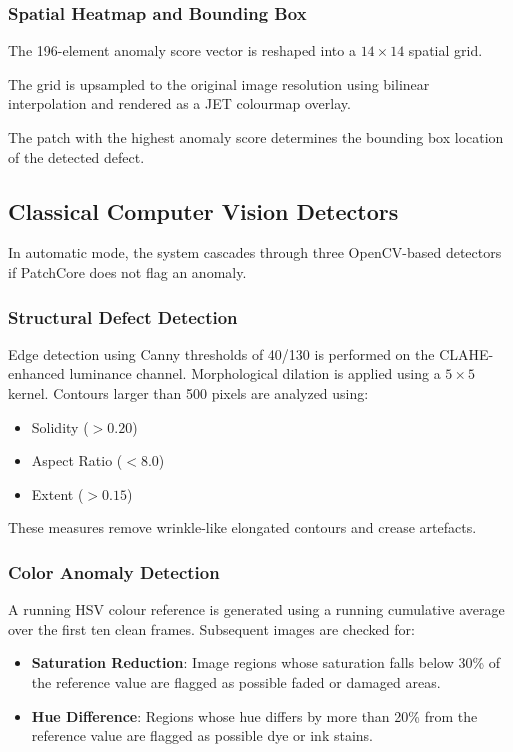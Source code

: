 \documentclass{ieeeaccess}
\begin{document}
\subsubsection{Spatial Heatmap and Bounding Box}
The 196-element anomaly score vector is reshaped into a $14 \times 14$ spatial grid.

The grid is upsampled to the original image resolution using bilinear interpolation and rendered as a JET colourmap overlay.

The patch with the highest anomaly score determines the bounding box location of the detected defect.

\subsection{Classical Computer Vision Detectors}
In automatic mode, the system cascades through three OpenCV-based detectors if PatchCore does not flag an anomaly.

\subsubsection{Structural Defect Detection}
Edge detection using Canny thresholds of 40/130 is performed on the CLAHE-enhanced luminance channel. Morphological dilation is applied using a $5 \times 5$ kernel. Contours larger than 500 pixels are analyzed using:
\begin{itemize}
    \item Solidity ($> 0.20$)
    \item Aspect Ratio ($< 8.0$)
    \item Extent ($> 0.15$)
\end{itemize}
These measures remove wrinkle-like elongated contours and crease artefacts.

\subsubsection{Color Anomaly Detection}
A running HSV colour reference is generated using a running cumulative average over the first ten clean frames. Subsequent images are checked for:
\begin{itemize}
    \item \textbf{Saturation Reduction}: Image regions whose saturation falls below 30\% of the reference value are flagged as possible faded or damaged areas.
    \item \textbf{Hue Difference}: Regions whose hue differs by more than 20\% from the reference value are flagged as possible dye or ink stains.
\end{itemize}
\end{document}
